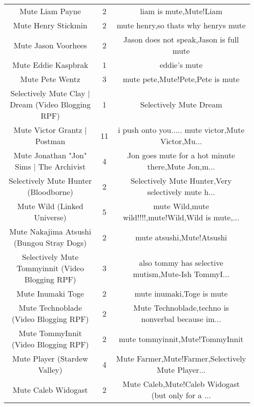 \begin{table}[h!]
{\begin{tabular}{|c|c|c|}
                                   Mute Liam Payne &      2 &                             liam is mute,Mute!Liam \\
                               Mute Henry Stickmin &      2 &                mute henry,so thats why henrys mute \\
                               Mute Jason Voorhees &      2 &            Jason does not speak,Jason is full mute \\
                               Mute Eddie Kaspbrak &      1 &                                       eddie's mute \\
                                   Mute Pete Wentz &      3 &                   mute pete,Mute!Pete,Pete is mute \\
Selectively Mute Clay | Dream (Video Blogging RPF) &      1 &                             Selectively Mute Dream \\
                      Mute Victor Grantz | Postman &     11 & i push onto you..... mute victor,Mute Victor,Mu... \\
          Mute Jonathan "Jon" Sims | The Archivist &      4 & Jon goes mute for a hot minute there,Mute Jon,m... \\
              Selectively Mute Hunter (Bloodborne) &      2 & Selectively Mute Hunter,Very selectively mute h... \\
                       Mute Wild (Linked Universe) &      5 & mute Wild,mute wild!!!!,mute!Wild,Wild is mute,... \\
         Mute Nakajima Atsushi (Bungou Stray Dogs) &      2 &                          mute atsushi,Mute!Atsushi \\
  Selectively Mute Tommyinnit (Video Blogging RPF) &      3 & also tommy has selective mutism,Mute-Ish TommyI... \\
                                 Mute Inumaki Toge &      2 &                          mute inumaki,Toge is mute \\
             Mute Technoblade (Video Blogging RPF) &      2 & Mute Technoblade,techno is nonverbal because im... \\
              Mute TommyInnit (Video Blogging RPF) &      2 &                    mute tommyinnit,Mute!TommyInnit \\
                      Mute Player (Stardew Valley) &      4 & Mute Farmer,Mute!Farmer,Selectively Mute Player... \\
                               Mute Caleb Widogast &      2 & Mute Caleb,Mute!Caleb Widogast (but only for a ... \\

\end{tabular}}
\end{table}
